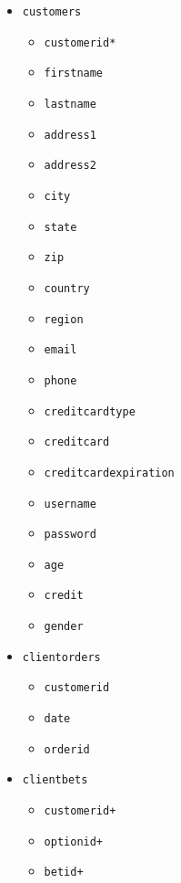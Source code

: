 \documentclass{article}
\begin{document}
\begin{multicols}{2}
\begin{itemize}
    \item\texttt{customers}
        \begin{itemize}
            \item\texttt{customerid*} 
            \item\texttt{firstname}
            \item\texttt{lastname}
            \item\texttt{address1}
            \item\texttt{address2}
            \item\texttt{city}
            \item\texttt{state}
            \item\texttt{zip}
            \item\texttt{country}
            \item\texttt{region}
            \item\texttt{email}
            \item\texttt{phone}
            \item\texttt{creditcardtype}
            \item\texttt{creditcard}
            \item\texttt{creditcardexpiration}
            \item\texttt{username}
            \item\texttt{password}
            \item\texttt{age}
            \item\texttt{credit}
            \item\texttt{gender}
        \end{itemize}
    \item\texttt{clientorders}
        \begin{itemize}
            \item\texttt{customerid}
            \item\texttt{date}
            \item\texttt{orderid}
        \end{itemize}
    \columnbreak
    \item\texttt{clientbets}
        \begin{itemize}
            \item\texttt{customerid+}
            \item\texttt{optionid+}
            \item\texttt{betid+}

\end{itemize}
\end{itemize}
\end{multicols}
\end{document}
